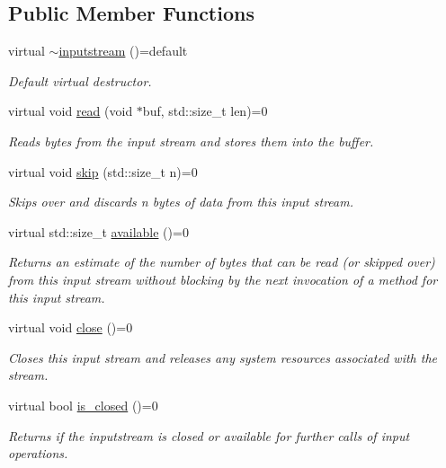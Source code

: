 \subsection*{Public Member Functions}
\begin{DoxyCompactItemize}
\item 
virtual \hyperlink{structdevfix_1_1base_1_1io_1_1inputstream_a1da9f4c189be9ee315caabd2b4fdc125}{$\sim$inputstream} ()=default
\begin{DoxyCompactList}\small\item\em Default virtual destructor. \end{DoxyCompactList}\item 
virtual void \hyperlink{structdevfix_1_1base_1_1io_1_1inputstream_a17e1a21881ae263650ebdaafaee2e71a}{read} (void $\ast$buf, std\+::size\+\_\+t len)=0
\begin{DoxyCompactList}\small\item\em Reads bytes from the input stream and stores them into the buffer. \end{DoxyCompactList}\item 
virtual void \hyperlink{structdevfix_1_1base_1_1io_1_1inputstream_a1868a733fd646b29daae6874e07e4e03}{skip} (std\+::size\+\_\+t n)=0
\begin{DoxyCompactList}\small\item\em Skips over and discards n bytes of data from this input stream. \end{DoxyCompactList}\item 
virtual std\+::size\+\_\+t \hyperlink{structdevfix_1_1base_1_1io_1_1inputstream_ace04813af676b6c81fa452eb4d81a796}{available} ()=0
\begin{DoxyCompactList}\small\item\em Returns an estimate of the number of bytes that can be read (or skipped over) from this input stream without blocking by the next invocation of a method for this input stream. \end{DoxyCompactList}\item 
virtual void \hyperlink{structdevfix_1_1base_1_1io_1_1inputstream_a1188eff97757eb9625be91dfeca17af7}{close} ()=0
\begin{DoxyCompactList}\small\item\em Closes this input stream and releases any system resources associated with the stream. \end{DoxyCompactList}\item 
virtual bool \hyperlink{structdevfix_1_1base_1_1io_1_1inputstream_a9da6b400424ff476ed0479193c219fa9}{is\+\_\+closed} ()=0
\begin{DoxyCompactList}\small\item\em Returns if the {\itshape inputstream} is closed or available for further calls of input operations. \end{DoxyCompactList}\end{DoxyCompactItemize}


